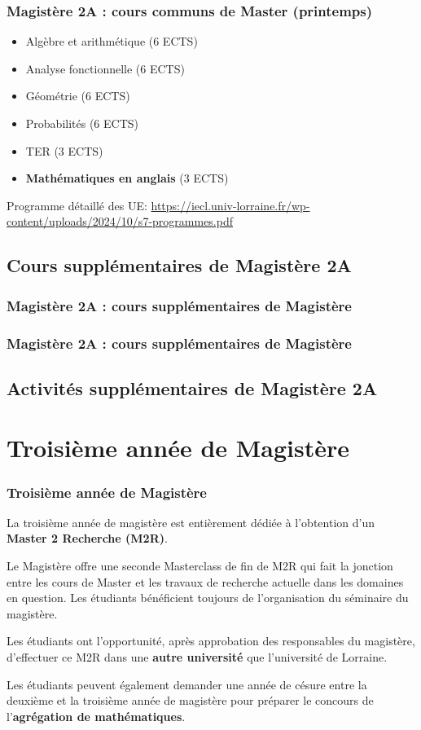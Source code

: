 \documentclass[slidetop,11pt]{beamer}
\begin{document}
\begin{frame}
\frametitle{Magistère 2A : cours communs de Master (printemps)}
\begin{itemize}
\item Algèbre et arithmétique (6 ECTS)
\item Analyse fonctionnelle (6 ECTS)
\item Géométrie (6 ECTS)
\item Probabilités (6 ECTS)
\item TER (3 ECTS)
\item \textbf{Mathématiques en anglais} (3 ECTS)
\end{itemize}


\bigskip
Programme détaillé des UE: 
\url{https://iecl.univ-lorraine.fr/wp-content/uploads/2024/10/s7-programmes.pdf}
\end{frame}

\subsection{Cours supplémentaires de Magistère 2A}

\begin{frame}
\frametitle{Magistère 2A : cours supplémentaires de Magistère}

\end{frame}


\begin{frame}
\frametitle{Magistère 2A : cours supplémentaires de Magistère}

\end{frame}

\subsection{Activités supplémentaires de Magistère 2A}



\section{Troisième année de Magistère}
\begin{frame}
\frametitle{Troisième année de Magistère}

La troisième année de magistère est entièrement dédiée à l'obtention d'un \textbf{Master 2 Recherche (M2R)}.

Le Magistère offre une seconde Masterclass de fin de M2R qui fait la jonction entre les cours de Master et les travaux de recherche actuelle dans les domaines en question. Les étudiants bénéficient toujours de l'organisation du séminaire du magistère.

\bigskip
Les étudiants ont l'opportunité, après approbation des responsables du magistère, d'effectuer ce M2R dans une \textbf{autre université} que l'université de Lorraine.

\bigskip
Les étudiants peuvent également demander une année de césure entre la deuxième et la troisième année de magistère pour préparer le concours de l'\textbf{agrégation de mathématiques}.

\end{frame}
\end{document}
